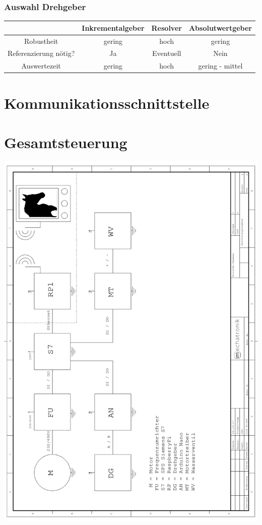 \subsubsection{Auswahl Drehgeber}
\label{sec:auswahlDrehgeber}

\begin{tabular}{|c|c|c|c|}
\hline 
   & Inkrementalgeber & Resolver & Absolutwertgeber \\ 
\hline 
Robustheit & gering & hoch & gering \\ 
\hline 
Referenzierung nötig? & Ja & Eventuell & Nein \\ 
\hline 
Auswertezeit & gering & hoch & gering - mittel \\ 
\hline 
\end{tabular} 

\newpage
\section{Kommunikationsschnittstelle}
\label{sec:kommunikationsschnittstelle}



\newpage

\section{Gesamtsteuerung}
\label{sec:gesamtsteuerung}

\begin{center}
\includegraphics[scale=0.86]{Blockschaltbild1}
\end{center}


